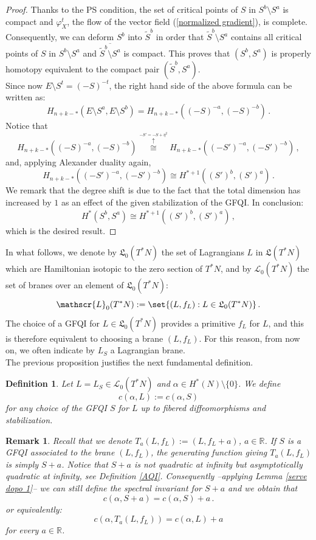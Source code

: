 \documentclass{article}
\newcommand{\1}{\mathbbm{1}}
\newcommand{\numberset}{\mathbb}
\newcommand{\R}{\numberset{R}}
\newtheorem{defn}[thm]{Definition}
\newtheorem{rem}[thm]{Remark}
\theoremstyle{remark}
\begin{document}
{{\begin{proof}
Thanks to the PS condition, the set of critical points of $S$ in $S^b \setminus S^a$ is compact and $\varphi_X^t$, the flow of the vector field (\ref{normalized gradient}), is complete. Consequently, we can deform $S^b$ into $\tilde{S}^b$ in order that $\tilde{S}^b \setminus S^a$ contains all critical points of $S$ in $S^b \setminus S^a$ and $\overline{\tilde{S}^b \setminus S^a}$ is compact. This proves that $(S^b,S^a)$ is properly homotopy equivalent to the compact pair $(\tilde{S}^b,S^a)$. \\
Since now $E \setminus S^{t} = (-S)^{-t}$, the right hand side of the above formula can be written as:
$$H_{n+k-*} (E \setminus S^a, E \setminus S^b) = H_{n+k-*}((-S)^{-a},(-S)^{-b})\, .$$
Notice that
$$H_{n+k-*}((-S)^{-a},(-S)^{-b}) \stackrel{\stackrel{-S' = -S +\eta^2}{\uparrow}} {\cong} H_{n+k-*}((-S')^{-a},(-S')^{-b})\, ,$$
and, applying Alexander duality again,
$$H_{n+k-*}((-S')^{-a},(-S')^{-b}) \cong H^{* + 1}((S')^b,(S')^a)\, .$$
We remark that the degree shift is due to the fact that the total dimension has increased by $1$ as an effect of the given stabilization of the GFQI. In conclusion:
$$H^*(S^b,S^a) \cong  H^{* + 1}((S')^b,(S')^a)\, ,$$
which is the desired result.
\end{proof}
\noindent In what follows, we denote by $\mathfrak{L}_0(T^*N)$ the set of Lagrangians $L$ in $\mathfrak{L}(T^*N)$ which are Hamiltonian isotopic to the zero section of $T^*N$, and by ${\mathscr L}_0(T^*N)$ the set of branes over an element of $\mathfrak L_0(T^*N)$:
$$\mathscr{L}_0(T^*N) := \set{ (L, f_L): L \in \mathfrak{L}_0(T^*N) }\, .$$
The choice of a GFQI for $L \in \mathfrak{L}_0(T^*N)$ provides a primitive $f_L$ for $L$, and this is therefore equivalent to choosing a brane $(L,f_L)$. For this reason, from now on, we often indicate by $L_S$ a Lagrangian brane. \\
\noindent The previous proposition justifies the next fundamental definition. 
\begin{defn}
Let $L = L_S \in\mathscr{L}_0(T^*N)$ and $\alpha\in H^*(N) \setminus \{0\}$. We define
$$c(\alpha, L) := c(\alpha, S)$$ 
for any choice of the GFQI $S$ for $L$ up to fibered diffeomorphisms and stabilization.
\end{defn}
\begin{rem} \label{costante a}
\textnormal{
Recall that we denote $T_a(L,f_L) := (L,f_L + a)$, $a \in \mathbb{R}$. If $S$ is a GFQI associated to the brane $(L, f_L)$, the generating function giving $T_a(L, f_L)$ is simply $S+a$. Notice that $S+a$ is not quadratic at infinity but asymptotically quadratic at infinity, see Definition \ref{AQI}. Consequently --applying Lemma \ref{serve dopo 1}-- we can still define the spectral invariant for $S +a$ and we obtain that
\begin{equation*}
c(\alpha, S+a)=c(\alpha, S)+a\, .
\end{equation*}
or equivalently:
\begin{equation*}
c(\alpha, T_a(L, f_L)) = c(\alpha, L) + a
\end{equation*}
for every $a \in \R$.}
\end{rem}

}}
\end{document}
